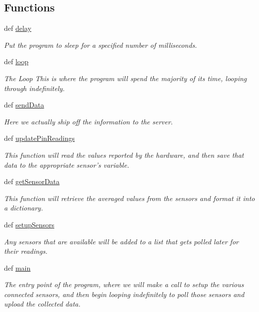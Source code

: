 \subsection*{Functions}
\begin{DoxyCompactItemize}
\item 
def \hyperlink{namespacesensing_a110922c2a80aabf038d162595e137cc4}{delay}
\begin{DoxyCompactList}\small\item\em Put the program to sleep for a specified number of milliseconds. \end{DoxyCompactList}\item 
def \hyperlink{namespacesensing_afc4f85f529614a384ee1d04cd5ff80f3}{loop}
\begin{DoxyCompactList}\small\item\em The Loop This is where the program will spend the majority of its time, looping through indefinitely. \end{DoxyCompactList}\item 
def \hyperlink{namespacesensing_aeae2450fef0f1a9244c1ddc6d96ef4c2}{send\-Data}
\begin{DoxyCompactList}\small\item\em Here we actually ship off the information to the server. \end{DoxyCompactList}\item 
def \hyperlink{namespacesensing_a75479ff0f15da4027d590f94160bb43f}{update\-Pin\-Readings}
\begin{DoxyCompactList}\small\item\em This function will read the values reported by the hardware, and then save that data to the appropriate sensor's variable. \end{DoxyCompactList}\item 
def \hyperlink{namespacesensing_af9472a5ce179d5f4cbbc2d02a9dbed14}{get\-Sensor\-Data}
\begin{DoxyCompactList}\small\item\em This function will retrieve the averaged values from the sensors and format it into a dictionary. \end{DoxyCompactList}\item 
def \hyperlink{namespacesensing_a3b1d400f9ad84146d60ee62f7e82faa0}{setup\-Sensors}
\begin{DoxyCompactList}\small\item\em Any sensors that are available will be added to a list that gets polled later for their readings. \end{DoxyCompactList}\item 
def \hyperlink{namespacesensing_a38d7f8a9b27bbcf471a89725a5e78493}{main}
\begin{DoxyCompactList}\small\item\em The entry point of the program, where we will make a call to setup the various connected sensors, and then begin looping indefinitely to poll those sensors and upload the collected data. \end{DoxyCompactList}\end{DoxyCompactItemize}
